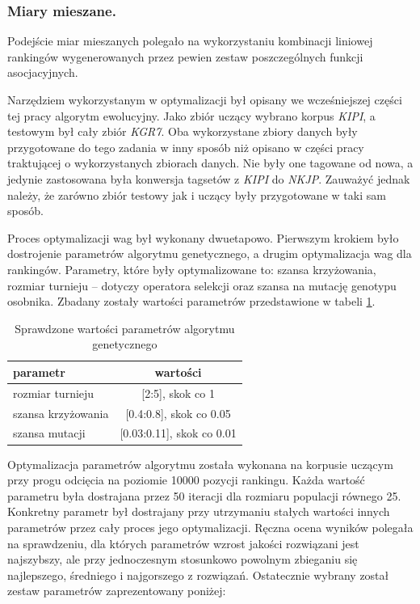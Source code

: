 \documentclass[11pt,a4paper]{llncs}
\begin{document}
\subsubsection{Miary mieszane.}
Podejście miar mieszanych polegało na wykorzystaniu kombinacji liniowej rankingów wygenerowanych przez pewien zestaw poszczególnych funkcji asocjacyjnych.

Narzędziem wykorzystanym w optymalizacji był opisany we wcześniejszej części tej pracy algorytm ewolucyjny.
Jako zbiór uczący wybrano korpus \emph{KIPI}, a testowym był cały zbiór \emph{KGR7}.
Oba wykorzystane zbiory danych były przygotowane do tego zadania w inny sposób niż opisano w części pracy traktującej o wykorzystanych zbiorach danych.
Nie były one tagowane od nowa, a jedynie zastosowana była konwersja tagsetów z \emph{KIPI} do \emph{NKJP}.
Zauważyć jednak należy, że zarówno zbiór testowy jak i uczący były przygotowane w taki sam sposób.

Proces optymalizacji wag był wykonany dwuetapowo.
Pierwszym krokiem było dostrojenie parametrów algorytmu genetycznego, a drugim optymalizacja wag dla rankingów.
Parametry, które były optymalizowane to: szansa krzyżowania, rozmiar turnieju -- dotyczy operatora selekcji oraz szansa na mutację genotypu osobnika.
Zbadany zostały wartości parametrów przedstawione w tabeli \ref{optimizer_parameters_optimization}.
\begin{table}[h!]
\centering
\begin{tabular}{ l | c }
	\toprule
	parametr & wartości \\
	\midrule
	rozmiar turnieju & [2:5], skok co 1\\
	szansa krzyżowania & [0.4:0.8], skok co 0.05\\
	szansa mutacji & [0.03:0.11], skok co 0.01\\ 
	\bottomrule
\end{tabular}
\caption[Sprawdzone wartości parametrów algorytmu genetycznego]{Sprawdzone wartości parametrów algorytmu genetycznego}
\label{optimizer_parameters_optimization}
\end{table}

Optymalizacja parametrów algorytmu została wykonana na korpusie uczącym przy progu odcięcia na poziomie 10000 pozycji rankingu.
Każda wartość parametru była dostrajana przez 50 iteracji dla rozmiaru populacji równego 25.
Konkretny parametr był dostrajany przy utrzymaniu stałych wartości innych parametrów przez cały proces jego optymalizacji.
Ręczna ocena wyników polegała na sprawdzeniu, dla których parametrów wzrost jakości rozwiązani jest najszybszy, ale przy jednoczesnym stosunkowo powolnym zbieganiu się najlepszego, średniego i najgorszego z rozwiązań.
Ostatecznie wybrany został zestaw parametrów zaprezentowany poniżej:
\end{document}
